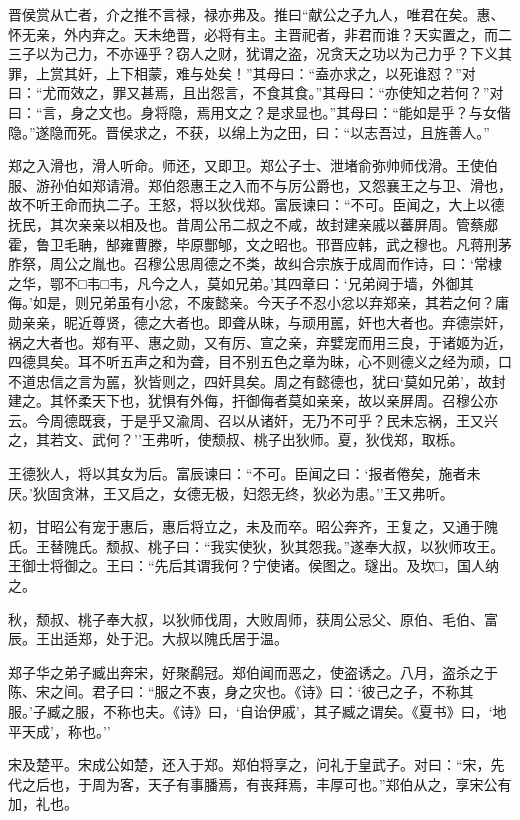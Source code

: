 \documentclass[]{article}
\begin{document}
晋侯赏从亡者，介之推不言禄，禄亦弗及。推曰``献公之子九人，唯君在矣。惠、怀无亲，外内弃之。天未绝晋，必将有主。主晋祀者，非君而谁？天实置之，而二三子以为己力，不亦诬乎？窃人之财，犹谓之盗，况贪天之功以为己力乎？下义其罪，上赏其奸，上下相蒙，难与处矣！''其母曰：``盍亦求之，以死谁怼？''对曰：``尤而效之，罪又甚焉，且出怨言，不食其食。''其母曰：``亦使知之若何？''对曰：``言，身之文也。身将隐，焉用文之？是求显也。''其母曰：``能如是乎？与女偕隐。''遂隐而死。晋侯求之，不获，以绵上为之田，曰：``以志吾过，且旌善人。''

郑之入滑也，滑人听命。师还，又即卫。郑公子士、泄堵俞弥帅师伐滑。王使伯服、游孙伯如郑请滑。郑伯怨惠王之入而不与厉公爵也，又怨襄王之与卫、滑也，故不听王命而执二子。王怒，将以狄伐郑。富辰谏曰：``不可。臣闻之，大上以德抚民，其次亲亲以相及也。昔周公吊二叔之不咸，故封建亲戚以蕃屏周。管蔡郕霍，鲁卫毛聃，郜雍曹滕，毕原酆郇，文之昭也。邗晋应韩，武之穆也。凡蒋刑茅胙祭，周公之胤也。召穆公思周德之不类，故纠合宗族于成周而作诗，曰：`常棣之华，鄂不□韦□韦，凡今之人，莫如兄弟。'其四章曰：`兄弟阋于墙，外御其侮。'如是，则兄弟虽有小忿，不废懿亲。今天子不忍小忿以弃郑亲，其若之何？庸勋亲亲，昵近尊贤，德之大者也。即聋从昧，与顽用嚚，奸也大者也。弃德崇奸，祸之大者也。郑有平、惠之勋，又有厉、宣之亲，弃嬖宠而用三良，于诸姬为近，四德具矣。耳不听五声之和为聋，目不别五色之章为昧，心不则德义之经为顽，口不道忠信之言为嚚，狄皆则之，四奸具矣。周之有懿德也，犹曰`莫如兄弟'，故封建之。其怀柔天下也，犹惧有外侮，扞御侮者莫如亲亲，故以亲屏周。召穆公亦云。今周德既衰，于是乎又渝周、召以从诸奸，无乃不可乎？民未忘祸，王又兴之，其若文、武何？''王弗听，使颓叔、桃子出狄师。夏，狄伐郑，取栎。

王德狄人，将以其女为后。富辰谏曰：``不可。臣闻之曰：`报者倦矣，施者未厌。'狄固贪淋，王又启之，女德无极，妇怨无终，狄必为患。''王又弗听。

初，甘昭公有宠于惠后，惠后将立之，未及而卒。昭公奔齐，王复之，又通于隗氏。王替隗氏。颓叔、桃子曰：``我实使狄，狄其怨我。''遂奉大叔，以狄师攻王。王御士将御之。王曰：``先后其谓我何？宁使诸。侯图之。璲出。及坎□，国人纳之。

秋，颓叔、桃子奉大叔，以狄师伐周，大败周师，获周公忌父、原伯、毛伯、富辰。王出适郑，处于汜。大叔以隗氏居于温。

郑子华之弟子臧出奔宋，好聚鹬冠。郑伯闻而恶之，使盗诱之。八月，盗杀之于陈、宋之间。君子曰：``服之不衷，身之灾也。《诗》曰：`彼己之子，不称其服。'子臧之服，不称也夫。《诗》曰，`自诒伊戚'，其子臧之谓矣。《夏书》曰，`地平天成'，称也。''

宋及楚平。宋成公如楚，还入于郑。郑伯将享之，问礼于皇武子。对曰：``宋，先代之后也，于周为客，天子有事膰焉，有丧拜焉，丰厚可也。''郑伯从之，享宋公有加，礼也。
\end{document}
